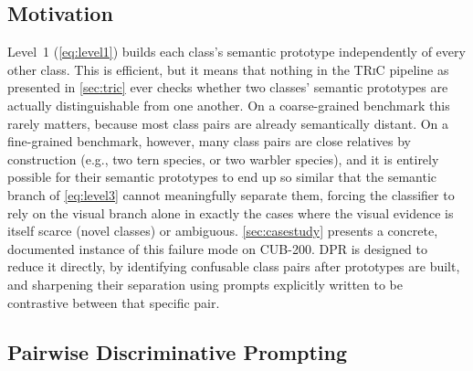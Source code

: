 \documentclass{iutbscthesis}
\begin{document}
\subsection{Motivation}

Level~1 (\autoref{eq:level1}) builds each class's semantic prototype independently of every other class. This is efficient, but it means that nothing in the \textsc{TRiC} pipeline as presented in \autoref{sec:tric} ever checks whether two classes' semantic prototypes are actually distinguishable from one another. On a coarse-grained benchmark this rarely matters, because most class pairs are already semantically distant. On a fine-grained benchmark, however, many class pairs are close relatives by construction (e.g., two tern species, or two warbler species), and it is entirely possible for their semantic prototypes to end up so similar that the semantic branch of \autoref{eq:level3} cannot meaningfully separate them, forcing the classifier to rely on the visual branch alone in exactly the cases where the visual evidence is itself scarce (novel classes) or ambiguous. \autoref{sec:casestudy} presents a concrete, documented instance of this failure mode on CUB-200. DPR is designed to reduce it directly, by identifying confusable class pairs after prototypes are built, and sharpening their separation using prompts explicitly written to be contrastive between that specific pair.

\subsection{Pairwise Discriminative Prompting}
\end{document}
